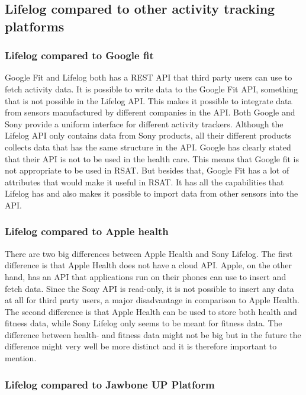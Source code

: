 \documentclass{cslthse-msc}
\begin{document}
\subsection{Lifelog compared to other activity tracking platforms}

\subsubsection{Lifelog compared to Google fit}
Google Fit and Lifelog both has a REST API that third party users can use to fetch activity data. It is possible to write data to the Google Fit API, something that is not possible in the Lifelog API. This makes it possible to integrate data from sensors manufactured by different companies in the API. Both Google and Sony provide a uniform interface for different activity trackers. Although the Lifelog API only contains data from Sony products, all their different products collects data that has the same structure in the API. Google has clearly stated that their API is not to be used in the health care. This means that Google fit is not appropriate to be used in RSAT. But besides that, Google Fit has a lot of attributes that would make it useful in RSAT. It has all the capabilities that Lifelog has and also makes it possible to import data from other sensors into the API. 



\subsubsection{Lifelog compared to Apple health} 

There are two big differences between Apple Health and Sony Lifelog. The first difference is that Apple Health does not have a cloud API. Apple, on the other hand, has an API that applications run on their phones can use to insert and fetch data. Since the Sony API is read-only, it is not possible to insert any data at all for third party users, a major disadvantage in comparison to Apple Health. The second difference is that Apple Health can be used to store both health and fitness data, while Sony Lifelog only seems to be meant for fitness data. The difference between health- and fitness data might not be big but in the future the difference might very well be more distinct and it is therefore important to mention. 

\subsubsection{Lifelog compared to Jawbone UP Platform}
\end{document}
